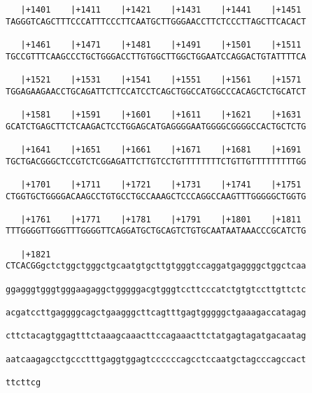 \documentclass{article}
\begin{document}
\begin{Verbatim}
   |+1401    |+1411    |+1421    |+1431    |+1441    |+1451 
TAGGGTCAGCTTTCCCATTTCCCTTCAATGCTTGGGAACCTTCTCCCTTAGCTTCACACT
                                                            
   |+1461    |+1471    |+1481    |+1491    |+1501    |+1511 
TGCCGTTTCAAGCCCTGCTGGGACCTTGTGGCTTGGCTGGAATCCAGGACTGTATTTTCA
                                                            
   |+1521    |+1531    |+1541    |+1551    |+1561    |+1571 
TGGAGAAGAACCTGCAGATTCTTCCATCCTCAGCTGGCCATGGCCCACAGCTCTGCATCT
                                                            
   |+1581    |+1591    |+1601    |+1611    |+1621    |+1631 
GCATCTGAGCTTCTCAAGACTCCTGGAGCATGAGGGGAATGGGGCGGGGCCACTGCTCTG
                                                            
   |+1641    |+1651    |+1661    |+1671    |+1681    |+1691 
TGCTGACGGGCTCCGTCTCGGAGATTCTTGTCCTGTTTTTTTTCTGTTGTTTTTTTTTGG
                                                            
   |+1701    |+1711    |+1721    |+1731    |+1741    |+1751 
CTGGTGCTGGGGACAAGCCTGTGCCTGCCAAAGCTCCCAGGCCAAGTTTGGGGGCTGGTG
                                                            
   |+1761    |+1771    |+1781    |+1791    |+1801    |+1811 
TTTGGGGTTGGGTTTGGGGTTCAGGATGCTGCAGTCTGTGCAATAATAAACCCGCATCTG
                                                            
   |+1821                                                   
CTCACGGgctctggctgggctgcaatgtgcttgtgggtccaggatgaggggctggctcaa
                                                            
ggagggtgggtgggaagaggctgggggacgtgggtccttcccatctgtgtccttgttctc
                                                            
acgatccttgaggggcagctgaagggcttcagtttgagtgggggctgaaagaccatagag
                                                            
cttctacagtggagtttctaaagcaaacttccagaaacttctatgagtagatgacaatag
                                                            
aatcaagagcctgccctttgaggtggagtccccccagcctccaatgctagcccagccact
                                                            
ttcttcg
       
       
\end{Verbatim}
\end{document}
